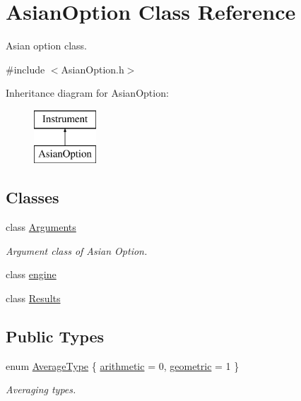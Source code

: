 \hypertarget{class_asian_option}{}\section{Asian\+Option Class Reference}
\label{class_asian_option}


Asian option class.  




{\ttfamily \#include $<$Asian\+Option.\+h$>$}

Inheritance diagram for Asian\+Option\+:\begin{figure}[H]
\begin{center}
\leavevmode
\includegraphics[height=2.000000cm]{class_asian_option}
\end{center}
\end{figure}
\subsection*{Classes}
\begin{DoxyCompactItemize}
\item 
class \hyperlink{class_asian_option_1_1_arguments}{Arguments}
\begin{DoxyCompactList}\small\item\em Argument class of Asian Option. \end{DoxyCompactList}\item 
class \hyperlink{class_asian_option_1_1engine}{engine}
\item 
class \hyperlink{class_asian_option_1_1_results}{Results}
\end{DoxyCompactItemize}
\subsection*{Public Types}
\begin{DoxyCompactItemize}
\item 
enum \hyperlink{class_asian_option_add7292791bf85820ff9fdbfd4407f3b9}{Average\+Type} \{ \hyperlink{class_asian_option_add7292791bf85820ff9fdbfd4407f3b9aff8fffb81d05144807269caa96d3b145}{arithmetic} = 0, 
\hyperlink{class_asian_option_add7292791bf85820ff9fdbfd4407f3b9a17b74dba78a6e25158da4eb685ecfa4e}{geometric} = 1
 \}\begin{DoxyCompactList}\small\item\em Averaging types. \end{DoxyCompactList}
\end{DoxyCompactItemize}
